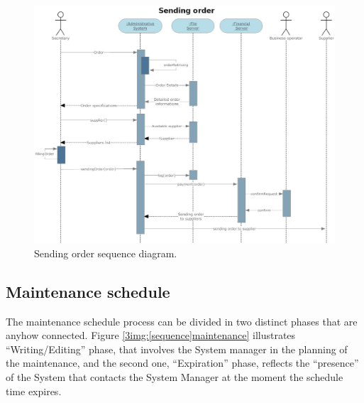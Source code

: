 \begin{figure}[H]
\begin{centering}
\includegraphics[scale=0.45,angle=90]{assign3/sdraw/imgs/sending_order.jpg}
\caption{Sending order sequence diagram.}
\label{3img:[sequence]sending_order}
\end{centering}
\end{figure}


\subsection{Maintenance schedule}
The maintenance schedule process can be divided in two distinct phases that are anyhow connected. Figure \ref{3img:[sequence]maintenance} illustrates ``Writing/Editing'' phase, that involves the System manager in the planning of the maintenance, and the second one, ``Expiration'' phase, reflects the ``presence'' of the System that contacts the System Manager at the moment the schedule time expires.


